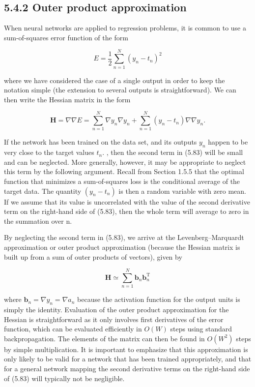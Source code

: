 \documentclass[
  10
]{article}
\begin{document}
\subsection{5.4.2 Outer product
approximation}\label{outer-product-approximation}

When neural networks are applied to regression problems, it is common to
use a sum-of-squares error function of the form

\[
E = \frac {1}{2} \sum_ {n = 1} ^ {N} (y _ {n} - t _ {n}) ^ {2}\tag{5.82}
\]

where we have considered the case of a single output in order to keep
the notation simple (the extension to several outputs is
straightforward). We can then write the Hessian matrix in the form

\[
\mathbf {H} = \nabla \nabla E = \sum_ {n = 1} ^ {N} \nabla y _ {n} \nabla y _ {n} + \sum_ {n = 1} ^ {N} (y _ {n} - t _ {n}) \nabla \nabla y _ {n}.\tag{5.83}
\]

If the network has been trained on the data set, and its outputs
\(y _ { n }\) happen to be very close to the target values
\(t _ { n } .\) , then the second term in (5.83) will be small and can
be neglected. More generally, however, it may be appropriate to neglect
this term by the following argument. Recall from Section 1.5.5 that the
optimal function that minimizes a sum-of-squares loss is the conditional
average of the target data. The quantity
\(\left( y _ { n } - t _ { n } \right)\) is then a random variable with
zero mean. If we assume that its value is uncorrelated with the value of
the second derivative term on the right-hand side of (5.83), then the
whole term will average to zero in the summation over n.~

By neglecting the second term in (5.83), we arrive at the
Levenberg--Marquardt approximation or outer product approximation
(because the Hessian matrix is built up from a sum of outer products of
vectors), given by

\[
\mathbf {H} \simeq \sum_ {n = 1} ^ {N} \mathbf {b} _ {n} \mathbf {b} _ {n} ^ {\mathrm{T}}\tag{5.84}
\]

where \(\mathbf { b } _ { n } = \nabla y _ { n } = \nabla a _ { n }\)
because the activation function for the output units is simply the
identity. Evaluation of the outer product approximation for the Hessian
is straightforward as it only involves first derivatives of the error
function, which can be evaluated efficiently in \(O ( W )\) steps using
standard backpropagation. The elements of the matrix can then be found
in \(O ( W ^ { 2 } )\) steps by simple multiplication. It is important
to emphasize that this approximation is only likely to be valid for a
network that has been trained appropriately, and that for a general
network mapping the second derivative terms on the right-hand side of
(5.83) will typically not be negligible.
\end{document}
